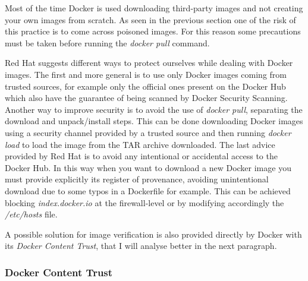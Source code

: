 \documentclass[a4paper,12pt]{article}
\begin{document}
Most of the time Docker is used downloading third-party images and not creating
your own images from scratch. As seen in the previous section one of the risk of
this practice is to come across poisoned images. For this reason some
precautions must be taken before running the \textit{docker pull} command. \par
Red Hat suggests \cite{docker_image_insecurity} different ways to protect
ourselves while dealing with Docker images. The first and more general is to use
only Docker images coming from trusted sources, for example only the official
ones present on the Docker Hub which also have the guarantee of being scanned by
Docker Security Scanning. Another way to improve security is to avoid the use of
\textit{docker pull}, separating the download and unpack/install steps. This can
be done downloading Docker images using a security channel provided by a trusted
source and then running \textit{docker load} to load the image from the TAR
archive downloaded. The last advice provided by Red Hat is to avoid any
intentional or accidental access to the Docker Hub. In this way when you want to
download a new Docker image you must provide explicitly its register of
provenance, avoiding unintentional download due to some typos in a Dockerfile
for example. This can be achieved blocking \textit{index.docker.io} at the
firewall-level or by modifying accordingly the \textit{/etc/hosts} file. \par A
possible solution for image verification is also provided directly by Docker
with its \textit{Docker Content Trust}, that I will analyse better in the next
paragraph.

\subsubsection{Docker Content Trust}
\end{document}
